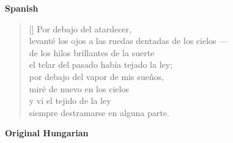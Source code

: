 \documentclass[a4paper,12pt,twoside,final]{book}
\begin{document}
\bigskip

\noindent \textbf{Spanish}


\settowidth{\versewidth}{levanté los ojos a las ruedas dentadas de los cielos ---}

\begin{verse}[\versewidth]
  Por debajo del atardecer, \\
  levanté los ojos a las ruedas dentadas de los cielos --- \\
  de los hilos brillantes de la suerte \\
  el telar del pasado había tejado la ley; \\
  por debajo del vapor de mis sueños, \\
  miré de nuevo en los cielos \\
  y vi el tejido de la ley \\
  siempre destramarse en alguna parte. \\
\end{verse}

\newpage


\noindent \textbf{Original Hungarian}



\settowidth{\versewidth}{törvényt szőtt a mult szövőszéke}
\end{document}
